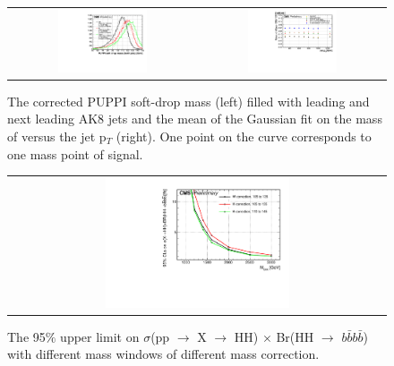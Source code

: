 \begin{figure}[t]
  \centering
  \begin{tabular}{cc}
    \includegraphics[width=0.5\textwidth]{Figures/ap1/j01.pdf}  &
    \includegraphics[width=0.5\textwidth]{Figures/ap1/MassMean_both.pdf} \\
  \end{tabular}
  \caption{The corrected PUPPI soft-drop mass (left) filled with leading and next leading AK8 jets and the mean of the Gaussian fit on the mass of versus the jet p$_{T}$ (right). One point on the curve corresponds to one mass point of signal.}

\end{figure}

\begin{figure}[t]
  \centering
  \begin{tabular}{c}
    \includegraphics[width=0.5\textwidth]{Figures/ap1/Limit2.pdf} 
  \end{tabular}
  \caption{The 95$\% $ upper limit on $\sigma$(pp $\rightarrow$ X $\rightarrow$ HH) $\times$ Br(HH $\rightarrow$ $b\bar{b}b\bar{b}$) with different mass windows of different mass correction.}

\end{figure}
